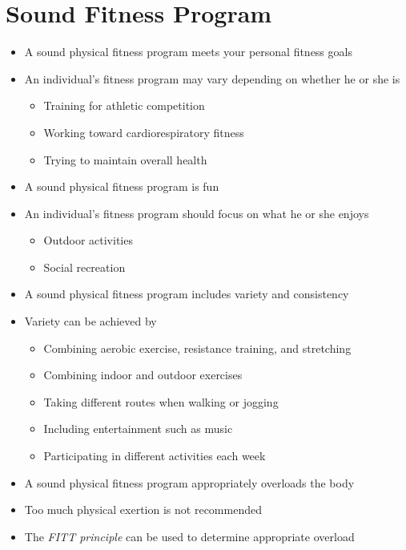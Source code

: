 \documentclass[title={Chapter 11}]{fdsn201notes}
\begin{document}
\section{Sound Fitness Program}\label{sec:sound-fitness-program}
\begin{itemize}
	\item A sound physical fitness program meets your personal fitness goals
	\item An individual’s fitness program may vary depending on whether he or she is
	\begin{itemize}
		\item Training for athletic competition
		\item Working toward cardiorespiratory fitness
		\item Trying to maintain overall health
	\end{itemize}
	\item A sound physical fitness program is fun
	\item An individual’s fitness program should focus on what he or she enjoys
	\begin{itemize}
		\item Outdoor activities
		\item Social recreation
	\end{itemize}
	\item A sound physical fitness program includes variety and consistency
	\item Variety can be achieved by
	\begin{itemize}
		\item Combining aerobic exercise, resistance training, and stretching
		\item Combining indoor and outdoor exercises
		\item Taking different routes when walking or jogging
		\item Including entertainment such as music
		\item Participating in different activities each week
	\end{itemize}
	\item A sound physical fitness program appropriately overloads the body
\end{itemize}

\begin{itemize}
	\item Too much physical exertion is not recommended
	\item The \emph{FITT principle} can be used to determine appropriate overload
\end{itemize}
\end{document}
